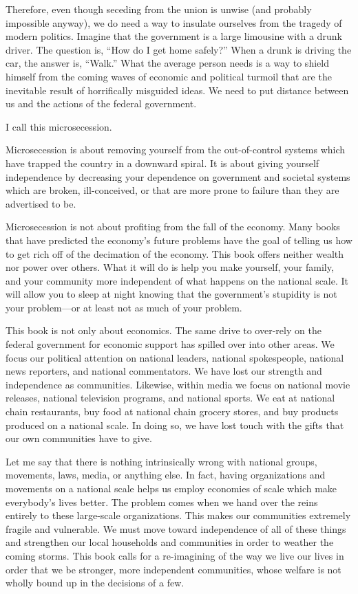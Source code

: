 Therefore, even though seceding from the union is unwise (and probably 
impossible anyway), we do need a
way to insulate ourselves from the tragedy of modern politics. Imagine
that the government is a large limousine with a drunk driver. The
question is, “How do I get home safely?”  When a drunk is driving the
car, the answer is, “Walk.”  What the average person needs is a way to
shield himself from the coming waves of economic and political turmoil
that are the inevitable result of horrifically misguided ideas. We need
to put distance between us and the actions of the federal government. 

I call this microsecession.

Microsecession is about removing yourself from the out-of-control systems
which have trapped the country in a downward spiral.  It is about giving
yourself independence by decreasing your dependence on government
and societal systems which are broken, ill-conceived, or that are 
more prone to failure than they are advertised to be.  

Microsecession is not about profiting from the fall of the economy.
Many books that have predicted the economy’s future problems have the
goal of telling us how to get rich off of the decimation of the
economy. This book
offers neither wealth
nor power over others. What it will do is help you make
yourself, your
family, and your community more independent of what happens on the
national scale. It will allow you to sleep at night knowing that
the government’s
stupidity is not your problem---or at least not as much of your problem.

This book is not only about economics. The same drive to over-rely on
the federal government for economic support has spilled over into other
areas. We focus our political attention on national leaders, national
spokespeople, national news reporters, and national commentators. We
have lost our strength and independence as communities. Likewise,
within media we focus on national movie releases, national television
programs, and national sports. We eat at national chain restaurants,
buy food at national chain grocery stores, and buy products produced on
a national scale. In doing so, we have lost touch with the gifts that
our own communities have to give. 

Let me say that there is nothing intrinsically wrong with national
groups, movements, laws, media, or anything else. In fact, having
organizations and movements on a national scale helps us employ
economies of scale which make everybody’s lives better. The problem
comes when we hand over the reins entirely to these large-scale
organizations. This makes our communities extremely fragile and
vulnerable. We must move toward independence of all of these things and
strengthen our local households and communities in order to weather the
coming storms. This book calls for a re-imagining of the way we live
our lives in order that we be stronger, more independent communities,
whose welfare is not wholly bound up in the decisions of a few.

